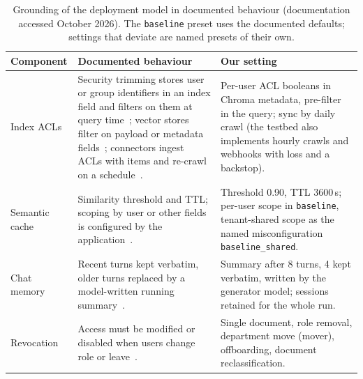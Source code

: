 \begin{table}[t]
\centering
\caption{Grounding of the deployment model in documented behaviour (documentation accessed October
2026). The \texttt{baseline} preset uses the documented defaults; settings that deviate are named
presets of their own.}
\label{tab:grounding}
\footnotesize
\setlength{\tabcolsep}{3pt}
\begin{tabular}{@{}p{2.6cm}p{6.6cm}p{7.4cm}@{}}
\toprule
Component & Documented behaviour & Our setting \\
\midrule
Index ACLs & Security trimming stores user or group identifiers in an index field and filters on
them at query time~\cite{doc_azure_trimming}; vector stores filter on payload or metadata
fields~\cite{doc_qdrant,doc_pinecone,doc_chroma}; connectors ingest ACLs with items and re-crawl on a
schedule~\cite{doc_graph_connectors}. & Per-user ACL booleans in Chroma metadata, pre-filter in the
query; sync by daily crawl (the testbed also implements hourly crawls and webhooks with loss and a
backstop). \\
Semantic cache & Similarity threshold and TTL; scoping by user or other fields is configured by the
application~\cite{doc_gptcache,doc_redisvl,bang2023gptcache,gill2024meancache}. & Threshold 0.90,
TTL 3600\,s; per-user scope in \texttt{baseline}, tenant-shared scope as the named misconfiguration
\texttt{baseline\_shared}. \\
Chat memory & Recent turns kept verbatim, older turns replaced by a model-written running
summary~\cite{doc_langchain_summary,doc_llamaindex_memory,wang2023recursively}. & Summary after 8
turns, 4 kept verbatim, written by the generator model; sessions retained for the whole run. \\
Revocation & Access must be modified or disabled when users change role or
leave~\cite{nist80053r5}. & Single document, role removal, department move (mover), offboarding,
document reclassification. \\
\bottomrule
\end{tabular}
\end{table}

